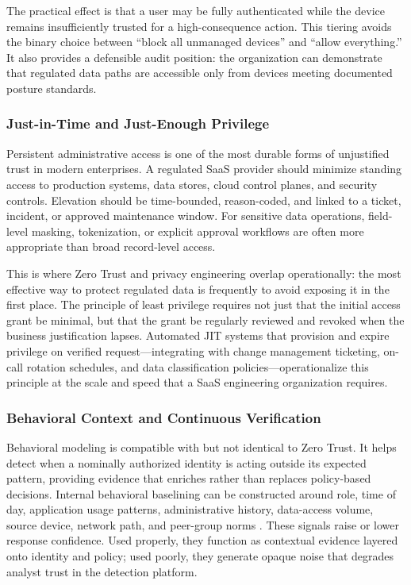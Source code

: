 \documentclass[acmlarge]{acmart}
\begin{document}
The practical effect is that a user may be fully authenticated while the device remains
insufficiently trusted for a high-consequence action. This tiering avoids the binary
choice between ``block all unmanaged devices'' and ``allow everything.'' It also provides
a defensible audit position: the organization can demonstrate that regulated data paths
are accessible only from devices meeting documented posture standards.

\subsubsection{Just-in-Time and Just-Enough Privilege}

Persistent administrative access is one of the most durable forms of unjustified trust in
modern enterprises. A regulated SaaS provider should minimize standing access to production
systems, data stores, cloud control planes, and security controls. Elevation should be
time-bounded, reason-coded, and linked to a ticket, incident, or approved maintenance
window. For sensitive data operations, field-level masking, tokenization, or explicit
approval workflows are often more appropriate than broad record-level access.

This is where Zero Trust and privacy engineering overlap operationally: the most effective
way to protect regulated data is frequently to avoid exposing it in the first place. The
principle of least privilege \cite{saltzer1975} requires not just that the initial access
grant be minimal, but that the grant be regularly reviewed and revoked when the business
justification lapses. Automated JIT systems that provision and expire privilege on verified
request---integrating with change management ticketing, on-call rotation schedules, and
data classification policies---operationalize this principle at the scale and speed that
a SaaS engineering organization requires.

\subsubsection{Behavioral Context and Continuous Verification}

Behavioral modeling is compatible with but not identical to Zero Trust. It helps detect
when a nominally authorized identity is acting outside its expected pattern, providing
evidence that enriches rather than replaces policy-based decisions. Internal behavioral
baselining can be constructed around role, time of day, application usage patterns,
administrative history, data-access volume, source device, network path, and peer-group
norms \cite{tuor2017}. These signals raise or lower response confidence. Used properly,
they function as contextual evidence layered onto identity and policy; used poorly, they
generate opaque noise that degrades analyst trust in the detection platform.
\end{document}
